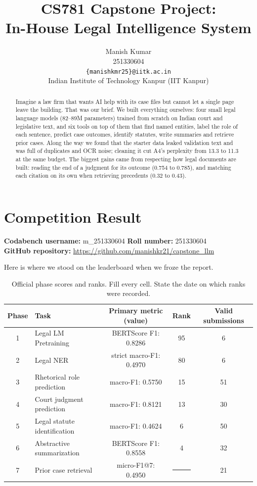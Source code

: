 \documentclass[11pt, oneside]{article}
\title{CS781 Capstone Project:\\
In-House Legal Intelligence System}
\author{
    Manish Kumar  \\
    251330604 \\
    {\tt \{manishkmr25\}@iitk.ac.in}\\
    Indian Institute of Technology Kanpur (IIT Kanpur)
}
\date{}
\newcommand{\fillin}{\rule{1.2cm}{0.4pt}}
\begin{document}
\maketitle

\begin{abstract}
Imagine a law firm that wants AI help with its case files but cannot let a single page leave the building.
That was our brief.  We built everything ourselves: four small legal language models (82--89M parameters)
trained from scratch on Indian court and legislative text, and six tools on top of them that find named
entities, label the role of each sentence, predict case outcomes, identify statutes, write summaries and
retrieve prior cases.  Along the way we found that the starter data leaked validation text and was full of
duplicates and OCR noise; cleaning it cut A4's perplexity from 13.3 to 11.3 at the same budget.  The biggest
gains came from respecting how legal documents are built: reading the end of a judgment for its outcome
(0.754 to 0.785), and matching each citation on its own when retrieving precedents (0.32 to 0.43).
\end{abstract}

\section{Competition Result}
\noindent
\textbf{Codabench username:} m\_251330604
\hfill
\textbf{Roll number:} 251330604\\
\textbf{GitHub repository:} \url{https://github.com/manishkr21/capstone_llm}

\medskip
\noindent
Here is where we stood on the leaderboard when we froze the report.

\begin{table}[H]
\centering
\caption{Official phase scores and ranks. Fill every cell. State the date on which ranks were recorded.}
\label{tab:leaderboard}
\small
\begin{tabular}{clccc}
\toprule
Phase & Task & Primary metric (value) & Rank & Valid submissions \\
\midrule
1 & Legal LM Pretraining & BERTScore F1: 0.8286 & 95 & 6 \\
2 & Legal NER & strict macro-F1: 0.4970 & 80 & 6 \\
3 & Rhetorical role prediction & macro-F1: 0.5750 & 15 & 51 \\
4 & Court judgment prediction & macro-F1: 0.8121 & 13 & 30 \\
5 & Legal statute identification & macro-F1: 0.4624 & 6 & 50 \\
6 & Abstractive summarization & BERTScore F1: 0.8558 & 4 & 32 \\
7 & Prior case retrieval & micro-F1@7: 0.4950 & \fillin & 21 \\
\bottomrule
\end{tabular}
\end{table}
\end{document}
